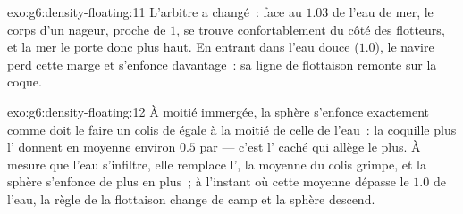 \begin{solution}{exo:g6:density-floating:11}
L'arbitre a changé~: face au $1.03$ de l'eau de mer, le corps d'un
nageur, proche de $1$, se trouve confortablement du côté des
flotteurs, et la mer le porte donc plus haut. En entrant dans l'eau
douce ($1.0$), le navire perd cette marge et s'enfonce davantage~: sa
ligne de flottaison remonte sur la coque.
\end{solution}

\begin{solution}{exo:g6:density-floating:12}
À moitié immergée, la sphère s'enfonce exactement comme doit le faire
un colis de  égale à la moitié de celle de l'eau~: la
coquille plus l' donnent en moyenne environ $0.5$  par
 --- c'est l' caché qui allège le plus. À mesure
que l'eau s'infiltre, elle remplace l', la  moyenne
du colis grimpe, et la sphère s'enfonce de plus en plus~; à l'instant
où cette moyenne dépasse le $1.0$ de l'eau, la règle de la flottaison
change de camp et la sphère descend.
\end{solution}

